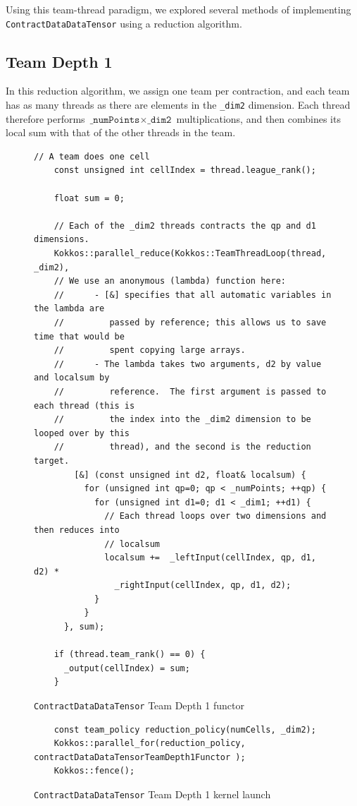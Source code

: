 Using this team-thread paradigm, we explored several methods of implementing
\texttt{ContractDataDataTensor} using a reduction algorithm.

\subsection{Team Depth 1}
    In this reduction algorithm, we assign one team per contraction, and each
    team has as many threads as there are elements in the \texttt{\_dim2}
    dimension.  Each thread therefore performs 
    $\texttt{\_numPoints} \times \texttt{\_dim2}$ multiplications, and then
    combines its local sum with that
    of the other threads in the team.


\begin{figure}[ht]
    \begin{lstlisting}[basicstyle=\tiny]
    // A team does one cell
    const unsigned int cellIndex = thread.league_rank();

    float sum = 0;
    
    // Each of the _dim2 threads contracts the qp and d1 dimensions.
    Kokkos::parallel_reduce(Kokkos::TeamThreadLoop(thread, _dim2),
    // We use an anonymous (lambda) function here:
    //      - [&] specifies that all automatic variables in the lambda are
    //         passed by reference; this allows us to save time that would be
    //         spent copying large arrays.
    //      - The lambda takes two arguments, d2 by value and localsum by
    //         reference.  The first argument is passed to each thread (this is
    //         the index into the _dim2 dimension to be looped over by this
    //         thread), and the second is the reduction target.
        [&] (const unsigned int d2, float& localsum) {
          for (unsigned int qp=0; qp < _numPoints; ++qp) {
            for (unsigned int d1=0; d1 < _dim1; ++d1) {
              // Each thread loops over two dimensions and then reduces into
              // localsum
              localsum +=  _leftInput(cellIndex, qp, d1, d2) *
                _rightInput(cellIndex, qp, d1, d2);
            }
          }
      }, sum);

    if (thread.team_rank() == 0) {
      _output(cellIndex) = sum;
    }
 \end{lstlisting}
\caption{\texttt{ContractDataDataTensor} Team Depth 1 functor
\label{lst:ContractDataDataTensorDepth1Functor}} 
\end{figure}

\begin{figure}[ht]
    \begin{lstlisting}
    const team_policy reduction_policy(numCells, _dim2);
    Kokkos::parallel_for(reduction_policy, contractDataDataTensorTeamDepth1Functor );
    Kokkos::fence();
 \end{lstlisting}
\caption{\texttt{ContractDataDataTensor} Team Depth 1 kernel launch
\label{lst:ContractDataDataTensorDepth1Call}} 
\end{figure}

